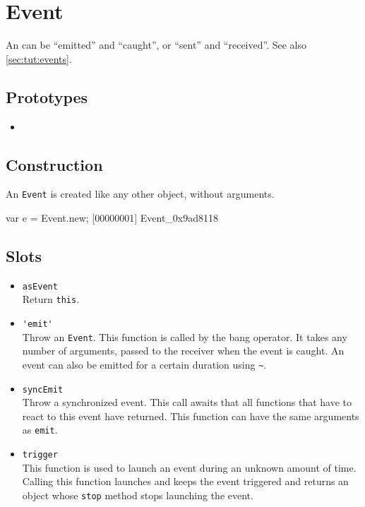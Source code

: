 \section{Event}

An  can be ``emitted'' and ``caught'', or ``sent'' and
``received''.  See also \autoref{sec:tut:events}.

\subsection{Prototypes}
\begin{itemize}
\item {}
\end{itemize}

\subsection{Construction}

An \lstinline{Event} is created like any other object, without
arguments.

\begin{urbiscript}
var e = Event.new;
[00000001] Event_0x9ad8118
\end{urbiscript}

\subsection{Slots}
\begin{itemize}
\item \lstinline|asEvent|\\
  Return \lstinline|this|.

\item \lstinline|'emit'|\\
  Throw an \lstinline|Event|. This function is called by the bang
  operator.  It takes any number of arguments, passed to the receiver
  when the event is caught. An event can also be emitted for a certain
  duration using \lstinline|~|.

\item \lstinline|syncEmit|\\
  Throw a synchronized event. This call awaits that all functions that
  have to react to this event have returned.  This function can have
  the same arguments as \lstinline|emit|.

\item \lstinline|trigger|\\
  This function is used to launch an event during an unknown amount of
  time. Calling this function launches and keeps the event triggered
  and returns an object whose \lstinline|stop| method stops launching
  the event.
\end{itemize}

